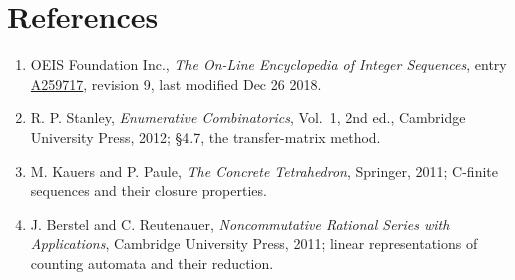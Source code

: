 \documentclass[11pt]{article}
\theoremstyle{definition}
\begin{document}
\section{References}

\begin{enumerate}

\item OEIS Foundation Inc., \emph{The On-Line Encyclopedia of Integer Sequences}, entry \href{https://oeis.org/A259717}{A259717}, revision 9, last modified Dec 26 2018.

\item R. P. Stanley, \emph{Enumerative Combinatorics}, Vol.~1, 2nd ed., Cambridge University Press, 2012; \S4.7, the transfer-matrix method.

\item M. Kauers and P. Paule, \emph{The Concrete Tetrahedron}, Springer, 2011; C-finite sequences and their closure properties.

\item J. Berstel and C. Reutenauer, \emph{Noncommutative Rational Series with Applications}, Cambridge University Press, 2011; linear representations of counting automata and their reduction.

\end{enumerate}
\end{document}
